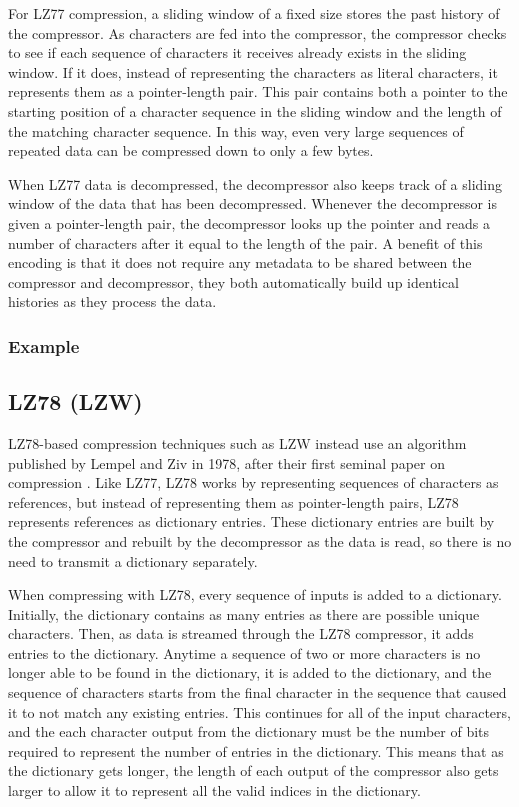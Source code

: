 \documentclass[doublespace,nopageskip]{VTthesis}
\begin{document}
For LZ77 compression, a sliding window of a fixed size stores the past history of the compressor. As characters are fed into the compressor, the compressor checks to see if each sequence of characters it receives already exists in the sliding window. If it does, instead of representing the characters as literal characters, it represents them as a pointer-length pair. This pair contains both a pointer to the starting position of a character sequence in the sliding window and the length of the matching character sequence. In this way, even very large sequences of repeated data can be compressed down to only a few bytes.

When LZ77 data is decompressed, the decompressor also keeps track of a sliding window of the data that has been decompressed. Whenever the decompressor is given a pointer-length pair, the decompressor looks up the pointer and reads a number of characters after it equal to the length of the pair. A benefit of this encoding is that it does not require any metadata to be shared between the compressor and decompressor, they both automatically build up identical histories as they process the data.

\subsubsection{Example}\label{sss:lz77_example}

\subsection{LZ78 (LZW)}\label{ss:lz78}
LZ78-based compression techniques such as LZW instead use an algorithm published by Lempel and Ziv in 1978, after their first seminal paper on compression \cite{lz78}. Like LZ77, LZ78 works by representing sequences of characters as references, but instead of representing them as pointer-length pairs, LZ78 represents references as dictionary entries. These dictionary entries are built by the compressor and rebuilt by the decompressor as the data is read, so there is no need to transmit a dictionary separately.

When compressing with LZ78, every sequence of inputs is added to a dictionary. Initially, the dictionary contains as many entries as there are possible unique characters. Then, as data is streamed through the LZ78 compressor, it adds entries to the dictionary. Anytime a sequence of two or more characters is no longer able to be found in the dictionary, it is added to the dictionary, and the sequence of characters starts from the final character in the sequence that caused it to not match any existing entries. This continues for all of the input characters, and the each character output from the dictionary must be the number of bits required to represent the number of entries in the dictionary. This means that as the dictionary gets longer, the length of each output of the compressor also gets larger to allow it to represent all the valid indices in the dictionary.
\end{document}
